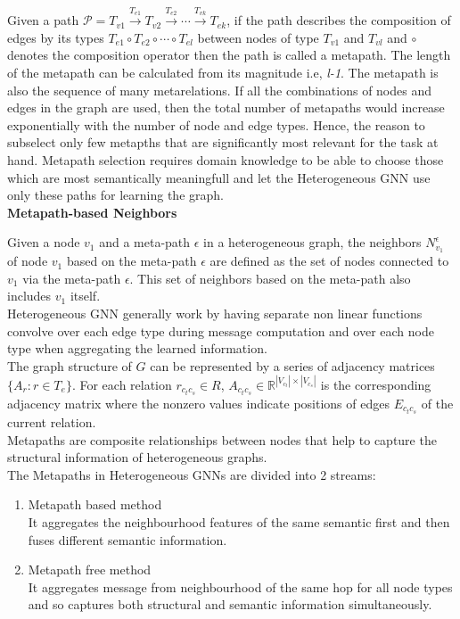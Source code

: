 \documentclass{report} %
\begin{document}
Given a path
\(
\mathcal{P} = T_{v1} \xrightarrow{T_{e1}} T_{v2} \xrightarrow{T_{e2}} \cdots \xrightarrow{T_{vk}} T_{ek}
\), 
if the path describes the composition of edges by its types \( T_{e1} \circ T_{e2} \circ \cdots \circ T_{el} \) between nodes of type \( T_{v1} \) and \( T_{vl} \) and 
$\circ$ denotes the composition operator then the path is called a metapath. The length of the metapath can be calculated from its magnitude i.e, \textit{l-1}. 
The metapath is also the sequence of many metarelations.  If all the combinations of nodes and edges in the graph are used, then the total number of metapaths would 
increase exponentially with the number of node and edge types. Hence, the reason to subselect only few metapths that are significantly most relevant for the task at hand. 
Metapath selection requires domain knowledge to be able to choose those which are most semantically meaningfull and let the Heterogeneous \ac{GNN} use only these paths 
for learning the graph. \\


\textbf{Metapath-based Neighbors}

Given a node \( v_1 \) and a meta-path \( \epsilon \) in a heterogeneous graph, the neighbors \( N_{v_1}^{\epsilon} \) of 
node \( v_1 \) based on the meta-path \( \epsilon \) are defined as the set of nodes connected to \( v_1 \) via the meta-path \( \epsilon \). 
This set of neighbors based on the meta-path also includes \( v_1 \) itself.\\

Heterogeneous \ac{GNN} generally work by having separate non linear functions convolve over each edge type during message computation and over each node type when aggregating the learned information. \\
The graph structure of \( G \) can be represented by a series of adjacency matrices \(\{A_r : r \in T_e\}\). 
For each relation \(r_{c_t c_s} \in R\), \(A_{c_t c_s} \in \mathbb{R}^{|V_{c_t}| \times |V_{c_s}|}\) is the corresponding 
adjacency matrix where the nonzero values indicate positions of edges \(E_{c_t c_s}\) of the current relation.\\

Metapaths are composite relationships between nodes that help to capture the structural information of heterogeneous graphs.\\

The Metapaths in Heterogeneous \ac{GNN}s are divided into 2 streams:
\begin{enumerate}
    \item Metapath based method\\
    It aggregates the neighbourhood features of the same semantic first and then fuses different semantic information.
    \item Metapath free method\\
    It aggregates message from neighbourhood of the same hop for all node types and so captures both structural and semantic information simultaneously.
\end{enumerate}
\end{document}
